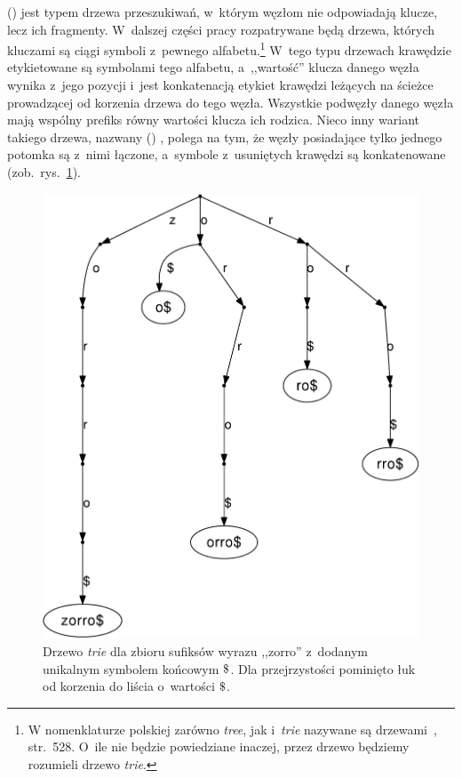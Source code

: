  () \cite{larsson99structures} jest typem
drzewa przeszukiwań, w~którym węzłom nie odpowiadają klucze, lecz ich fragmenty. W~dalszej
części pracy rozpatrywane będą drzewa, których kluczami są ciągi
symboli z~pewnego alfabetu.\footnote{W nomenklaturze polskiej zarówno
\emph{tree}, jak i~\emph{trie} nazywane są drzewami~\cite{pknuthv3}, str.~528.
O~ile nie będzie powiedziane inaczej, przez drzewo będziemy
rozumieli drzewo \emph{trie}.} W~tego typu drzewach
krawędzie etykietowane są symbolami tego alfabetu, a~,,wartość'' klucza danego węzła wynika z~jego
pozycji i~jest konkatenacją etykiet krawędzi leżących na ścieżce prowadzącej
od korzenia drzewa do tego węzła. Wszystkie podwęzły danego
węzła mają wspólny prefiks równy wartości klucza ich rodzica.
Nieco inny wariant takiego drzewa, nazwany 
() \cite{larsson99structures}, polega na tym, że węzły
posiadające tylko jednego potomka są z~nimi łączone, a~symbole z~usuniętych
krawędzi są konkatenowane (zob.~rys.~\ref{rys:tree}).

\begin{figure}[t]
    \begin{center}
       \includegraphics[scale=0.5]{figures/zorroSTrie.pdf}
    \end{center}

    \caption{Drzewo \emph{trie} dla zbioru sufiksów wyrazu ,,zorro'' z~dodanym unikalnym
    symbolem końcowym $\dollar$. Dla
    przejrzystości pominięto łuk od korzenia do liścia o~wartości $\dollar$.}%
    \label{rys:tree}
\end{figure}

